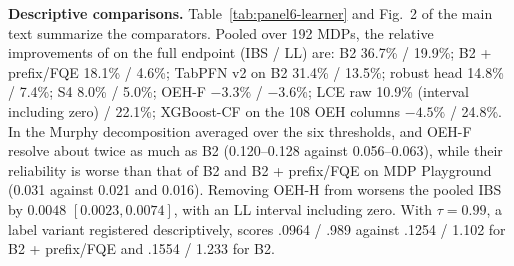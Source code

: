 \textbf{Descriptive comparisons.} Table~\ref{tab:panel6-learner} and Fig.~2 of the main text summarize the comparators. Pooled over 192 MDPs, the relative improvements of \OEH{} on the full endpoint (IBS / LL) are: B2 36.7\% / 19.9\%; B2 + prefix/FQE 18.1\% / 4.6\%; TabPFN v2 on B2 31.4\% / 13.5\%; robust head 14.8\% / 7.4\%; S4 8.0\% / 5.0\%; OEH-F $-3.3\%$ / $-3.6\%$; LCE raw 10.9\% (interval including zero) / 22.1\%; XGBoost-CF on the 108 OEH columns $-4.5\%$ / 24.8\%. In the Murphy decomposition averaged over the six thresholds, \OEH{} and OEH-F resolve about twice as much as B2 (0.120--0.128 against 0.056--0.063), while their reliability is worse than that of B2 and B2 + prefix/FQE on MDP Playground (0.031 against 0.021 and 0.016). Removing OEH-H from \OEH{} worsens the pooled IBS by $0.0048$ $[0.0023,0.0074]$, with an LL interval including zero. With $\tau=0.99$, a label variant registered descriptively, \OEH{} scores .0964 / .989 against .1254 / 1.102 for B2 + prefix/FQE and .1554 / 1.233 for B2.
